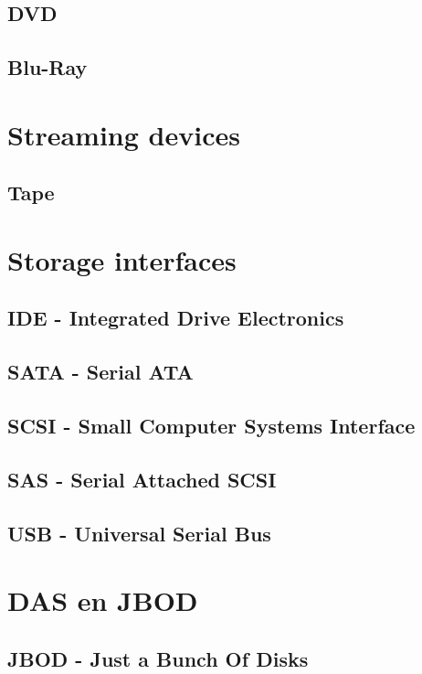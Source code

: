 \documentclass[a4paper,12pt,twoside,openright,titlepage]{book}
\begin{document}
\section{DVD}
\section{Blu-Ray}

\chapter{Streaming devices}

\section{Tape}


\chapter{Storage interfaces}
\section{IDE - Integrated Drive Electronics}

\section{SATA - Serial ATA}
\section{SCSI - Small Computer Systems Interface}

\section{SAS - Serial Attached SCSI}
\section{USB - Universal Serial Bus}

\chapter{DAS en JBOD}

\section{JBOD - Just a Bunch Of Disks}


\printindex
\end{document}
